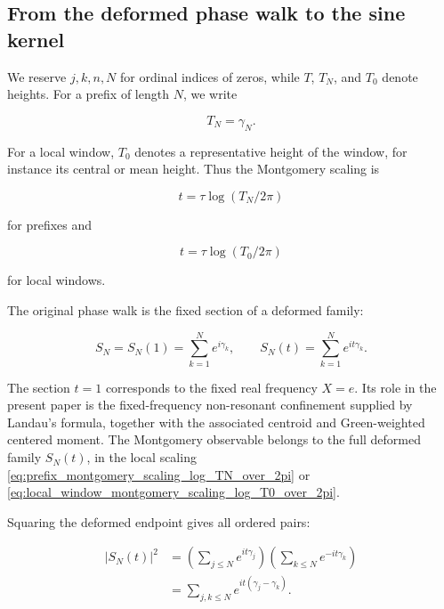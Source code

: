 \documentclass[11pt]{amsart}
\numberwithin{equation}{section}
\theoremstyle{plain}
\theoremstyle{definition}
\theoremstyle{remark}
\begin{document}
\subsection{From the deformed phase walk to the sine kernel}
\label{subsec:deformed_phase_walk_sine_kernel}

We reserve \(j,k,n,N\) for ordinal indices of zeros, while \(T\),
\(T_N\), and \(T_0\) denote heights. For a prefix of length \(N\), we
write

\begin{equation}
T_N=\gamma_N.
\label{eq:TN_as_gammaN_deformed_walk}
\end{equation}

For a local window, \(T_0\) denotes a representative height of the
window, for instance its central or mean height. Thus the Montgomery
scaling is

\begin{equation}
t=\tau\log(T_N/2\pi)
\label{eq:prefix_montgomery_scaling_log_TN_over_2pi}
\end{equation}

for prefixes and

\begin{equation}
t=\tau\log(T_0/2\pi)
\label{eq:local_window_montgomery_scaling_log_T0_over_2pi}
\end{equation}

for local windows.

The original phase walk is the fixed section of a deformed family:

\begin{equation}
S_N=S_N(1)=\sum_{k=1}^{N}e^{i\gamma_k},
\qquad
S_N(t)=\sum_{k=1}^{N}e^{it\gamma_k}.
\label{eq:fixed_and_deformed_phase_walks}
\end{equation}

The section \(t=1\) corresponds to the fixed real frequency \(X=e\).
Its role in the present paper is the fixed-frequency non-resonant
confinement supplied by Landau's formula, together with the associated
centroid and Green-weighted centered moment. The Montgomery observable
belongs to the full deformed family \(S_N(t)\), in the local scaling
\eqref{eq:prefix_montgomery_scaling_log_TN_over_2pi} or
\eqref{eq:local_window_montgomery_scaling_log_T0_over_2pi}.

Squaring the deformed endpoint gives all ordered pairs:

\begin{equation}
\begin{aligned}
|S_N(t)|^2
&=
\left(\sum_{j\le N}e^{it\gamma_j}\right)
\left(\sum_{k\le N}e^{-it\gamma_k}\right)  \\
&=
\sum_{j,k\le N}e^{it(\gamma_j-\gamma_k)}.
\end{aligned}
\label{eq:deformed_endpoint_pair_expansion}
\end{equation}
\end{document}

